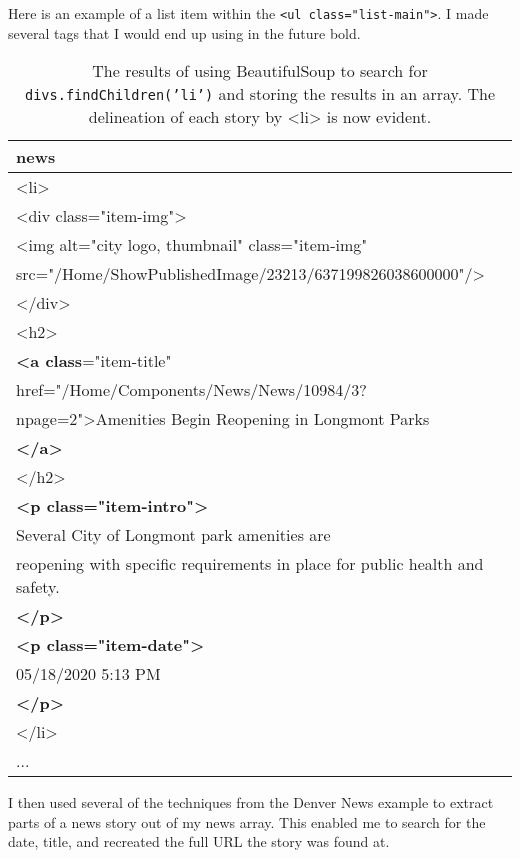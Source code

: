 \documentclass[]{article}
\newcommand{\code}[1]{\colorbox{light-gray}{\texttt{#1}}}
\begin{document}
Here is an example of a list item within the \code{<ul class="list-main">}.  I made several tags that I would end up using in the future bold.
\pagebreak
\begin{table}[!ht]
	\begin{center}
		\caption{The results of using BeautifulSoup to search for \code{divs.findChildren('li')} and storing the results in an array.  The delineation of each story by <li> is now evident.}
		\label{tab:table1}
		\begin{tabular}{|l|} 
			\hline
			\textbf{news} \\
			\hline
			<li>\\
			<div class="item-img">\\
			<img alt="city logo, thumbnail" class="item-img"\\ src="/Home/ShowPublishedImage/23213/637199826038600000"/>\\
			</div>\\
			<h2>\\
			\textbf{<a class}="item-title" \\
			href="/Home/Components/News/News/10984/3?\\
			npage=2">Amenities Begin Reopening in Longmont Parks\\
			\textbf{</a>}\\
			</h2>\\
			\textbf{<p class="item-intro">}\\
			Several City of Longmont park amenities are \\
			reopening with specific requirements in place for public health and safety.\\
			\textbf{</p>}\\
			\textbf{<p class="item-date">}\\
			05/18/2020 5:13 PM\\
			\textbf{</p>}\\
			</li>\\
			...\\
			\hline
		\end{tabular}
	\end{center}
\end{table}

I then used several of the techniques from the Denver News example to extract parts of a news story out of my news array. This enabled me to search for the date, title, and recreated the full URL the story was found at. 
\end{document}
